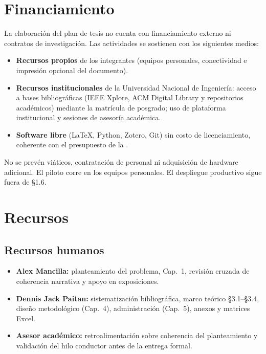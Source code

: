 \section{Financiamiento}

La elaboración del plan de tesis no cuenta con financiamiento externo ni contratos de investigación.
Las actividades se sostienen con los siguientes medios:

\begin{itemize}
  \item \textbf{Recursos propios} de los integrantes (equipos personales, conectividad e impresión
        opcional del documento).
  \item \textbf{Recursos institucionales} de la Universidad Nacional de Ingeniería: acceso a bases
        bibliográficas (IEEE Xplore, ACM Digital Library y repositorios académicos) mediante la
        matrícula de posgrado; uso de plataforma institucional y sesiones de asesoría académica.
  \item \textbf{Software libre} (\LaTeX{}, Python, Zotero, Git) sin costo de licenciamiento,
        coherente con el presupuesto de la .
\end{itemize}

No se prevén viáticos, contratación de personal ni adquisición de hardware adicional. El piloto
corre en los equipos personales. El despliegue productivo sigue fuera de §1.6.

\section{Recursos}

\subsection{Recursos humanos}

\begin{itemize}
  \item \textbf{Alex Mancilla:} planteamiento del problema, Cap.~1, revisión cruzada de coherencia
        narrativa y apoyo en exposiciones.
  \item \textbf{Dennis Jack Paitan:} sistematización bibliográfica, marco teórico §3.1--§3.4,
        diseño metodológico (Cap.~4), administración (Cap.~5), anexos y matrices Excel.
  \item \textbf{Asesor académico:} retroalimentación sobre coherencia del planteamiento y validación
        del hilo conductor antes de la entrega formal.
\end{itemize}

